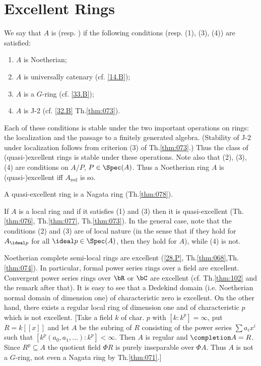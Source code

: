 \documentclass[../main]{subfiles}
\begin{document}
\section{Excellent Rings}\label{sec:34}

\begin{pardefinition}
We say that $A$ is  (resp. ) if the following conditions (resp. (1), (3), (4)) are satisfied:

\begin{enumerate}[label = (\arabic*)]
    \item $A$ is Noetherian;
    \item $A$ is universally catenary (cf. \ref{14.B});
    \item $A$ is a $G$-ring (cf. \ref{33.B});
    \item $A$ is J-2 (cf. \ref{32.B} Th.\ref{thm:073}).
\end{enumerate}
\end{pardefinition}

Each of these conditions is stable under the two important operations on rings: the localization and the passage to a finitely generated algebra. (Stability of J-2 under localization follows from criterion (3) of Th.\ref{thm:073}.) Thus the class of (quasi-)excellent rings is stable under these operations. Note also that (2), (3), (4) are conditions on $A/P$, $P \in \Spec(A)$. Thus a Noetherian ring $A$ is (quasi-)excellent iff $A_{\text{red}}$ is so. 

A quasi-excellent ring is a Nagata ring (Th.\ref{thm:078}).

If $A$ is a local ring and if it satisfies (1) and (3) then it is quasi-excellent (Th.\ref{thm:076}, Th.\ref{thm:077}, Th.\ref{thm:073}). In the general case, note that the conditions (2) and (3) are of local nature (in the sense that if they hold for $A_{\ideal p}$ for all $\ideal p \in \Spec(A)$, then they hold for $A$), while (4) is not.

\newparagraph Noetherian complete semi-local rings are excellent (\ref{28.P}, Th.\ref{thm:068},\linebreak Th.\ref{thm:074}). In particular, formal power series rings over a field are excellent. Convergent power series rings over $\bR$ or $\bC$ are excellent (cf. Th.\ref{thm:102} and the remark after that). It is easy to see that a Dedekind domain (i.e. Noetherian normal domain of dimension one) of characteristic zero is excellent. On the other hand, there exists a regular local ring of dimension one and of characteristic $p$ which is not excellent. [Take a field $k$ of char. $p$ with $[k : k^p] = \infty$, put $R = k[[x]]$ and let $A$ be the subring of $R$ consisting of the power series $\sum a_i x^i$ such that $[k^p(a_0, a_1, \ldots) : k^p] < \infty$. Then $A$ is regular and $\completion A = R$. Since $R^p \subseteq A$ the quotient field $\Phi R$ is purely inseparable over $\Phi A$. Thus $A$ is not a $G$-ring, not even a Nagata ring by Th.\ref{thm:071}.]
\end{document}
